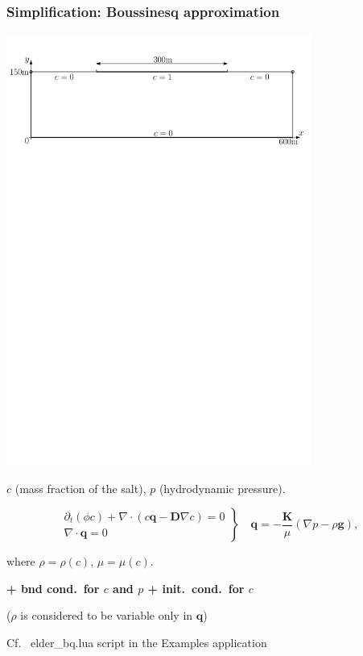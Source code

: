 \begin {frame} [t]
\frametitle {Simplification: Boussinesq approximation}

\vspace {-1.5ex}
\centerline {\includegraphics [width=0.75\textwidth] {Elder-2d-Scheme-ext.pdf}}

\centerline {{\color [rgb] {0, 0, 1} $c$} (mass fraction of the salt),
{\color [rgb] {0, 0, 1} $p$} (hydrodynamic pressure).}

\vspace {-2ex}
$$
 \left .
 \begin {array} {c}
  \partial_t (\phi c)
   + \nabla \cdot ( c \mathbf{q} - \mathbf{D} \nabla c ) = 0 \\[2ex]
  \nabla \cdot \mathbf{q} = 0
 \end {array}
 \right \} \quad \mathbf{q} = - \dfrac {\mathbf{K}} {\mu} (\nabla p - \rho \mathbf{g}),
$$
\centerline {where $\rho = \rho (c)$, $\mu = \mu (c)$.}

\vspace {1ex}
\centerline {\textbf {+ bnd cond.\ for $c$ and $p$ + init.\ cond.\ for $c$}}

\vspace {1ex}
\centerline {($\rho$ is considered to be variable only in $\mathbf{q}$)}

\vspace {1ex}
\centerline {Cf.\ {\color{blue} elder\_bq.lua} script in the Examples application}
\end {frame}

